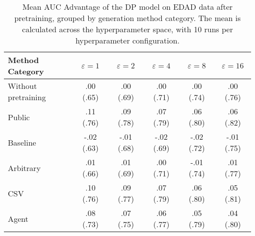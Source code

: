 \begin{table}[h!]
    \centering
    \caption{Mean AUC Advantage of the DP model on EDAD data after pretraining, grouped by generation method category. The mean is calculated across the hyperparameter space, with 10 runs per hyperparameter configuration.}
    \label{tab:epsilon_comparison}
    \begin{tabular}{lccccc}
    \toprule
    Method Category & $\varepsilon=1$ & $\varepsilon=2$ & $\varepsilon=4$ & $\varepsilon=8$ & $\varepsilon=16$ \\
    \midrule
    Without pretraining & .00 {\small (.65)} & .00 {\small (.69)} & .00 {\small (.71)} & .00 {\small (.74)} & .00 {\small (.76)} \\
    \arrayrulecolor{black!50!}\midrule
    Public & \cellcolor{gold!30}.11 {\small (.76)} & \cellcolor{gold!30}.09 {\small (.78)} & \cellcolor{gold!30}.07 {\small (.79)} & \cellcolor{silver!30}.06 {\small (.80)} & \cellcolor{gold!30}.06 {\small (.82)} \\
    \arrayrulecolor{black!50!}\midrule
    Baseline & -.02 {\small (.63)} & -.01 {\small (.68)} & -.02 {\small (.69)} & -.02 {\small (.72)} & -.01 {\small (.75)} \\
    \arrayrulecolor{black!50!}\midrule
    Arbitrary & .01 {\small (.66)} & .01 {\small (.69)} & .00 {\small (.71)} & -.01 {\small (.74)} & .01 {\small (.77)} \\
    \arrayrulecolor{black!50!}\midrule
    CSV & \cellcolor{silver!30}.10 {\small (.76)} & \cellcolor{silver!30}.09 {\small (.77)} & \cellcolor{silver!30}.07 {\small (.79)} & \cellcolor{gold!30}.06 {\small (.80)} & \cellcolor{silver!30}.05 {\small (.81)} \\
    Agent & \cellcolor{bronze!30}.08 {\small (.73)} & \cellcolor{bronze!30}.07 {\small (.75)} & \cellcolor{bronze!30}.06 {\small (.77)} & \cellcolor{bronze!30}.05 {\small (.79)} & \cellcolor{bronze!30}.04 {\small (.80)} \\
    \bottomrule
    \end{tabular}
\end{table}